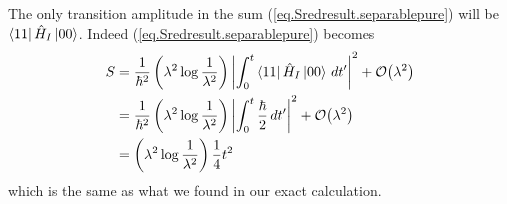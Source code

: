 The only transition amplitude in the sum (\ref{eq.Sredresult.separablepure}) will be \(\left\langle11\right| \hat{H}_I \left|00\right\rangle\). Indeed (\ref{eq.Sredresult.separablepure}) becomes
\begin{align*}
S &= \frac{1}{\hbar^2} \left(\lambda^2 \log \frac{1}{\lambda^2}\right) \left|\int_0^t \left\langle11\right| \hat{H}_I \left|00\right\rangle\,dt^\prime\right|^2 + \mathcal{O}{\left(\lambda^2\right)} \\
&= \frac{1}{\hbar^2} \left(\lambda^2 \log \frac{1}{\lambda^2}\right) \left|\int_0^t \frac{\hbar}{2}\,dt^\prime\right|^2 + \mathcal{O}{\left(\lambda^2\right)} \\
&= \left(\lambda^2 \log \frac{1}{\lambda^2}\right) \frac{1}{4} t^2
\end{align*}
which is the same as what we found in our exact calculation.



